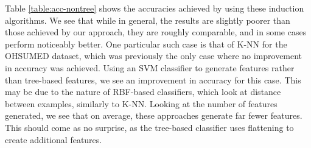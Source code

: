 \documentclass[twoside,11pt]{article}
\theoremstyle{definition}
\begin{document}
Table \ref{table:acc-nontree} shows the accuracies achieved by using these induction algorithms. We see that while in general, the results are slightly poorer than those achieved by our approach, they are roughly comparable, and in some cases perform noticeably better. One particular such case is that of K-NN for the OHSUMED dataset, which was previously the only case where no improvement in accuracy was achieved. Using an SVM classifier to generate features rather than tree-based features, we see an improvement in accuracy for this case. This may be due to the nature of RBF-based classifiers, which look at distance between examples, similarly to K-NN.
Looking at the number of features generated, we see that on average, these approaches generate far fewer features. This should come as no surprise, as the tree-based classifier uses flattening to create additional features.

\end{document}

